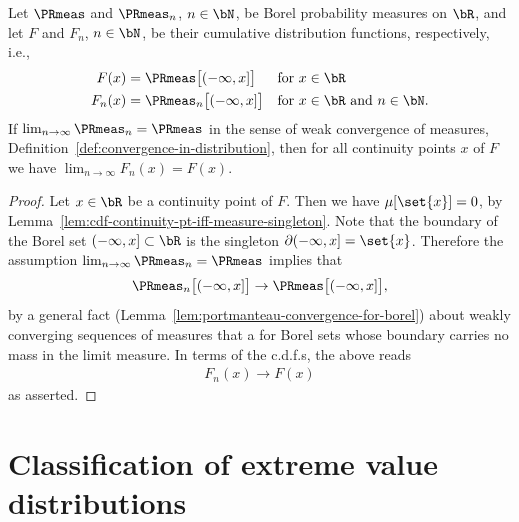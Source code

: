 \begin{lemma}
  \label{lem:cdf-convergence-from-convergence-in-distribution}
  \leanok
  Let $\PRmeas$ and $\PRmeas_n$, $n \in \bN$, be Borel
  probability measures on $\bR$, and let $F$ and $F_n$, $n \in \bN$,
  be their cumulative distribution functions, respectively, i.e.,
  \begin{align*}
      F(x) = \; & \PRmeas \big[(-\infty,x]\big] & & \text{for $x \in \bR$} \\
      F_n(x) = \; & \PRmeas_n \big[(-\infty,x]\big] & & \text{for $x \in \bR$ and $n \in \bN$.}
  \end{align*}
  If $\lim_{n \to \infty} \PRmeas_n = \PRmeas$ in the sense of weak convergence
  of measures, Definition~\ref{def:convergence-in-distribution}, then
  for all continuity points $x$ of $F$ we have
  $\lim_{n \to \infty} F_n(x) = F(x)$.
\end{lemma}
\begin{proof}
  \leanok
  Let $x \in \bR$ be a continuity point of $F$. Then we have $\mu [\set{x}] = 0$,
  by Lemma~\ref{lem:cdf-continuity-pt-iff-measure-singleton}.
  Note that the boundary of the Borel set $(-\infty,x] \subset \bR$ is
  the singleton $\partial (-\infty,x] = \set{x}$.
  Therefore the assumption $\lim_{n \to \infty} \PRmeas_n = \PRmeas$ implies that
  \begin{align*}
    \PRmeas_n \big[ (-\infty,x] \big] \to \PRmeas \big[ (-\infty,x] \big] ,
  \end{align*}
  by a general fact (Lemma~\ref{lem:portmanteau-convergence-for-borel})
  about weakly converging sequences of measures
  that a for Borel sets whose boundary carries no mass in the limit measure.
  In terms of the c.d.f.s, the above reads
  \begin{align*}
    F_n(x) \to F(x)
  \end{align*}
  as asserted.
\end{proof}


\chapter{Classification of extreme value distributions}

